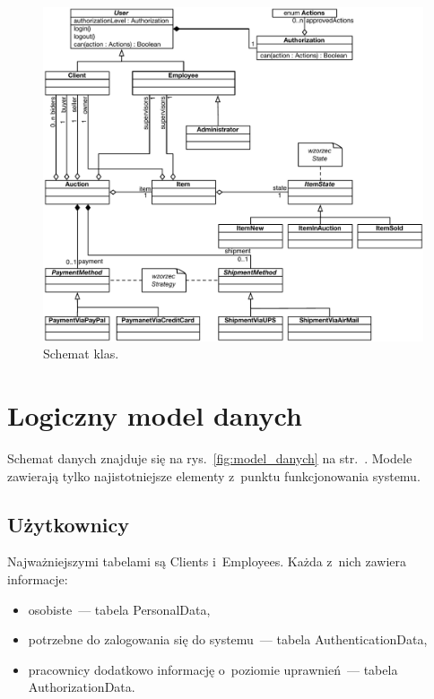 \documentclass[10pt,a4paper]{article}
\newcommand{\s}[1]{\textsf{#1}}
\begin{document}
\begin{figure}[p]
  \begin{adjustwidth}{-3cm}{-3cm}
    \centering
    \includegraphics{figury/diagram-klas}
    \caption{Schemat klas.}
    \label{fig:diagram_klas}
  \end{adjustwidth}
\end{figure}

\newpage
\section{Logiczny model danych}

Schemat danych znajduje się na rys.~\ref{fig:model_danych} na
str.~\pageref{fig:model_danych}. Modele zawierają tylko najistotniejsze
elementy z~punktu funkcjonowania systemu.

\subsection{Użytkownicy}

\noindent Najważniejszymi tabelami są \s{Clients} i~\s{Employees}. Każda z~nich
zawiera informacje:

\begin{itemize}
  \item osobiste~--- tabela \s{PersonalData},
  \item potrzebne do zalogowania się do systemu~--- tabela
    \s{AuthenticationData},
  \item pracownicy dodatkowo informację o~poziomie uprawnień~--- tabela
    \s{AuthorizationData}.
\end{itemize}
\end{document}
